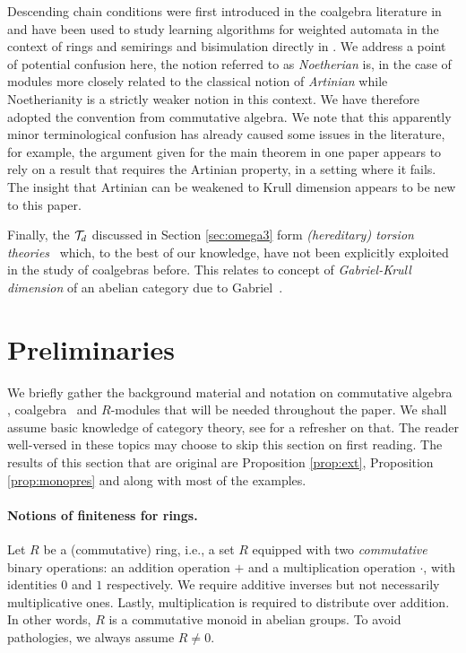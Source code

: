 \documentclass[runningheads]{llncs}
\begin{document}
 Descending chain conditions were first introduced in the coalgebra literature in \cite[Section 4]{urbat20} and have been used to study learning algorithms for weighted automata in the context of rings and semirings  \cite{rot20, aristote26} and bisimulation directly in \cite{Bhaduri23}. We address a point of potential confusion here, the notion referred to \cite[Section 4]{urbat20} as \emph{Noetherian} is, in the case of modules more closely related to the classical notion of \emph{Artinian} while Noetherianity is a strictly weaker notion in this context. We have therefore adopted the convention from commutative algebra. We note that this apparently minor terminological confusion has already caused some issues in the literature, for example, the argument given for the main theorem in one paper  \cite[Theorem 8]{aristote26} appears to rely on a result that requires the Artinian property, in a setting where it fails. The insight that Artinian can be weakened to Krull dimension appears to be new to this paper.
 
Finally, the $\mathcal T_d$ discussed in Section \ref{sec:omega3} form \emph{(hereditary) torsion theories}~\cite{dickson66} which, to the best of our knowledge, have not been explicitly exploited in the study of coalgebras before. 
This relates to concept of \emph{Gabriel-Krull dimension} of an abelian category due to Gabriel~\cite{gabriel62}. 


\section{Preliminaries}
\label{sec:prelim}
We briefly gather the background material and notation on commutative algebra \cite{eisenbud95}, coalgebra~\cite{Rutten00} and $R$-modules that will be needed throughout the paper.  
We shall assume basic knowledge of category theory, see \cite{MacLane98} for a refresher on that. 
 The reader well-versed in these topics may choose to skip this section on first reading.
 The results of this section that are original are Proposition \ref{prop:ext}, Proposition \ref{prop:monopres} and along with most of the examples.



\paragraph*{Notions of finiteness for rings.}
  Let $R$ be a (commutative) ring, i.e., a set $R$ equipped with two \emph{commutative} binary operations: an addition operation $+$ and a multiplication operation $\cdot$, with identities $0$ and $1$ respectively. We require additive inverses but not necessarily multiplicative ones. Lastly, multiplication is required to distribute over addition. In other words, $R$ is a commutative monoid in abelian groups. To avoid pathologies, we always assume $R\neq 0$.
\end{document}
